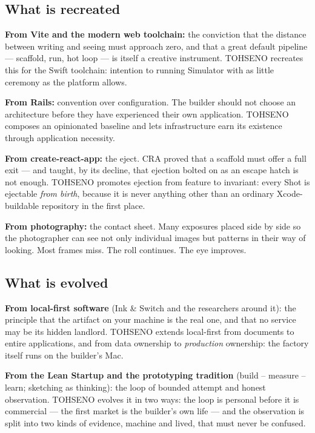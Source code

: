 \documentclass[11pt]{article}
\newcommand{\TOH}{TOHSENO}
\begin{document}
\subsection{What is recreated}

\textbf{From Vite and the modern web toolchain:} the conviction that the
distance between writing and seeing must approach zero, and that a great
default pipeline --- scaffold, run, hot loop --- is itself a creative
instrument. \TOH{} recreates this for the Swift toolchain: intention to
running Simulator with as little ceremony as the platform allows.

\textbf{From Rails:} convention over configuration. The builder should
not choose an architecture before they have experienced their own
application. \TOH{} composes an opinionated baseline and lets
infrastructure earn its existence through application necessity.

\textbf{From create-react-app:} the eject. CRA proved that a scaffold
must offer a full exit --- and taught, by its decline, that ejection
bolted on as an escape hatch is not enough. \TOH{} promotes ejection
from feature to invariant: every Shot is ejectable \emph{from birth},
because it is never anything other than an ordinary Xcode-buildable
repository in the first place.

\textbf{From photography:} the contact sheet. Many exposures placed side
by side so the photographer can see not only individual images but
patterns in their way of looking. Most frames miss. The roll continues.
The eye improves.

\subsection{What is evolved}

\textbf{From local-first software} (Ink \& Switch and the researchers
around it): the principle that the artifact on your machine is the real
one, and that no service may be its hidden landlord. \TOH{} extends
local-first from documents to entire applications, and from data
ownership to \emph{production} ownership: the factory itself runs on the
builder's Mac.

\textbf{From the Lean Startup and the prototyping tradition} (build --
measure -- learn; sketching as thinking): the loop of bounded attempt and
honest observation. \TOH{} evolves it in two ways: the loop is personal
before it is commercial --- the first market is the builder's own life
--- and the observation is split into two kinds of evidence, machine and
lived, that must never be confused.
\end{document}
